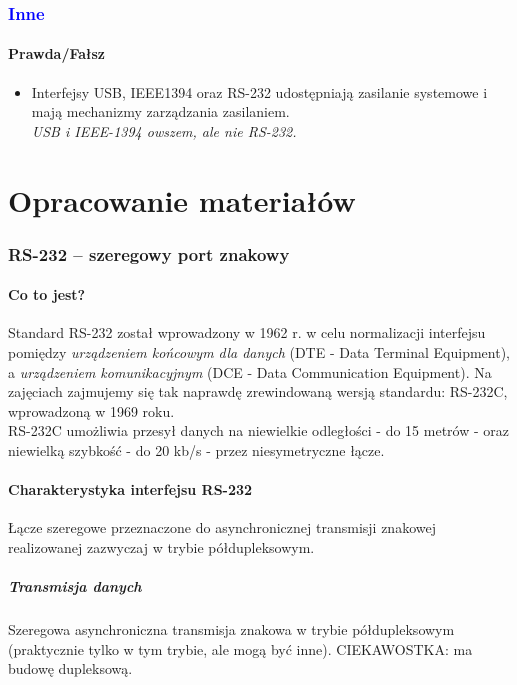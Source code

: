 \documentclass[a4paper,twoside]{article}
\begin{document}
\section{\textcolor{blue}{Inne}}
\subsection*{Prawda/Fałsz}
\begin{itemize}
	\item \textcolor{nie}{Interfejsy USB, IEEE1394 oraz RS-232 udostępniają zasilanie systemowe i mają mechanizmy zarządzania zasilaniem.} \\
	{\small \emph{USB i IEEE-1394 owszem, ale nie RS-232.}}
	
\end{itemize}

\pagebreak
\part{Opracowanie materiałów}

\section{RS-232 – szeregowy port znakowy}
	\subsection{Co to jest?}
	Standard RS-232 został wprowadzony w 1962 r. w celu normalizacji interfejsu pomiędzy \textit{urządzeniem końcowym dla danych} (DTE - Data Terminal Equipment), a \textit{urządzeniem komunikacyjnym} (DCE - Data Communication Equipment). Na zajęciach zajmujemy się tak naprawdę zrewindowaną wersją standardu: RS-232C, wprowadzoną w 1969 roku.\\
	RS-232C umożliwia przesył danych na niewielkie odległości - do 15 metrów - oraz niewielką szybkość - do 20 kb/s - przez niesymetryczne łącze.
	\subsection{Charakterystyka interfejsu RS-232}
		Łącze szeregowe przeznaczone do asynchronicznej transmisji znakowej realizowanej zazwyczaj w trybie półdupleksowym.
		\subsubsection{Transmisja danych}
		Szeregowa asynchroniczna transmisja znakowa w trybie półdupleksowym (praktycznie tylko w tym trybie, ale mogą być inne). CIEKAWOSTKA: ma budowę dupleksową.
\end{document}
